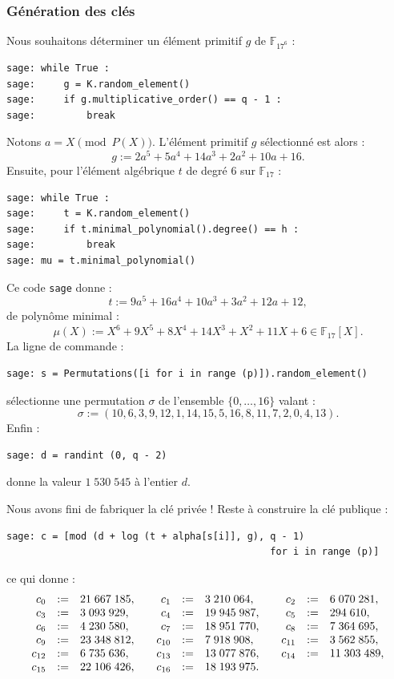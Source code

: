 \documentclass[a4paper, titlepage, 11pt]{article}
\theoremstyle{definition}
\theoremstyle{remark}
\def\gf #1{\mathbb{F}_{#1}}
\begin{document}
\subsubsection{Génération des clés}
Nous souhaitons déterminer un élément primitif $g$ de $\gf{17^6}$ :
\begin{verbatim}
sage: while True :
sage:     g = K.random_element()
sage:     if g.multiplicative_order() == q - 1 :
sage:         break
\end{verbatim}
Notons $a = X \pmod{P(X)}$. L'élément primitif $g$ sélectionné est alors :
$$g := 2a^5 + 5a^4 + 14a^3 + 2a^2 + 10a + 16.$$
Ensuite, pour l'élément algébrique $t$ de degré $6$ sur $\gf{17}$ :
\begin{verbatim}
sage: while True :
sage:     t = K.random_element()
sage:     if t.minimal_polynomial().degree() == h :
sage:         break
sage: mu = t.minimal_polynomial()
\end{verbatim}
Ce code \verb|sage| donne :
$$t := 9a^5 + 16a^4 + 10a^3 + 3a^2 + 12a + 12,$$
de polynôme minimal :
$$\mu(X) := X^6 + 9X^5 + 8X^4 + 14X^3 + X^2 + 11X + 6\in\gf{17}[X].$$
La ligne de commande :
\begin{verbatim}
sage: s = Permutations([i for i in range (p)]).random_element()
\end{verbatim}
sélectionne une permutation $\sigma$ de l'ensemble $\{0, \dots, 16\}$ valant :
$$\sigma := (10, 6, 3, 9, 12, 1, 14, 15, 5, 16, 8, 11, 7, 2, 0, 4, 13).$$
Enfin : 
\begin{verbatim}
sage: d = randint (0, q - 2)
\end{verbatim}
donne la valeur $1\;530\;545$ à l'entier $d$.

Nous avons fini de fabriquer la clé privée ! Reste à construire la clé publique :
\begin{verbatim}
sage: c = [mod (d + log (t + alpha[s[i]], g), q - 1)
                                              for i in range (p)]
\end{verbatim}
ce qui donne :
$$\begin{array}{r c l c r c l c r c l}
c_0 &:=& 21\;667\;185, &&
c_1 &:=& 3\;210\;064, &&
c_2 &:=& 6\;070\;281, \\
c_3 &:=& 3\;093\;929, &&
c_4 &:=& 19\;945\;987, &&
c_5 &:=& 294\;610, \\
c_6 &:=& 4\;230\;580, &&
c_7 &:=& 18\;951\;770, &&
c_8 &:=& 7\;364\;695, \\
c_9 &:=& 23\;348\;812, &&
c_{10} &:=& 7\;918\;908, &&
c_{11} &:=& 3\;562\;855, \\
c_{12} &:=& 6\;735\;636, &&
c_{13} &:=& 13\;077\;876, &&
c_{14} &:=& 11\;303\;489, \\
c_{15} &:=& 22\;106\;426, &&
c_{16} &:=& 18\;193\;975.
\end{array}$$
\end{document}
